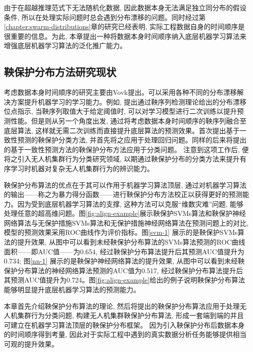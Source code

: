 由于在超越推理范式下无法随机化数据, 因此数据本身无法满足独立同分布的假设条件, 所以在处理实际问题时总会遇到分布漂移的问题。同时经过第\ref{chapter:swarm-distributions}章的研究已经表明, 实际工程数据自身的时间顺序是很重要的信息。为此, 本章提出一种将数据本身时间顺序纳入底层机器学习算法来增强底层机器学习算法的泛化推广能力。

\subsection{鞅保护分布方法研究现状}
考虑数据本身时间顺序的研究主要由Vovk提出。可以采用各种不同的分布漂移解决方案提升机器学习的学习能力。例如, \citet{Vovk2021retrain}提出通过鞅序列检测理论给出的分布漂移位点指示, 当鞅序列取值大于给定阈值时, 可以对学习模型进行二次训练以提升预测性能。但是则从另一个角度出发, 通过将考虑数据本身时间顺序的鞅序列融合至底层算法, 这样就无需二次训练而直接提升底层算法的预测效果。\citet{Vovk2021protectedregression}首次提出基于一致性预测的鞅保护分类方法, 并首先将之应用于处理回归问题。同样的\citet{Vovk2021protectedclassification}后来将提出的基于一致性预测方法的鞅保护分布方法应用于分类问题。 注意到这项工作后, 便将之引入无人机集群行为分类研究领域, 以期通过鞅保护分布的分类方法来提升有序学习时机器对复杂无人机集群行为的辨识能力。 

鞅保护分布算法的优点在于其可以作用于机器学习算法顶层, 通过对机器学习算法的输出——称之为暴力得分函数——进行鞅保护分布方法校正以获得更好的预测能力。因为受到底层机器学习算法的支撑, 这种方法可以克服“维数灾难”问题, 能够处理任意的超高维问题。图\ref{fig:align-example}展示鞅保护SVMs算法和鞅保护神经网络算法与无保护措施SVMs算法和无保护措施神经网络算法在预测问题上的对比, 模型的预测效果采用ROC曲线作为评价指标。图\ref{svm-1} 展示的是鞅保护SVMs算法的提升效果, 从图中可以看到未经鞅保护分布算法的SVMs算法预测的ROC曲线面积——即AUC值——为0.654, 经过鞅保护分布算法提升后其预测AUC值提升为0.734; 图\ref{nn-1} 展示的是鞅保护神经网络算法的提升效果, 从图中可以看到未经鞅保护分布算法的神经网络算法预测的AUC值为0.517, 经过鞅保护分布算法提升后其预测AUC值提升为0.724。图\ref{fig:align-example}给出的例子说明鞅保护分布算法能够明显提升底层机器学习算法的预测能力。

本章首先介绍鞅保护分布算法的理论, 然后将提出的鞅保护分布算法应用于处理无人机集群行为分类问题, 构建无人机集群鞅保护分布算法, 形成一套端到端的并且可建立在机器学习算法顶层的鞅保护分布框架。 因为引入鞅保护分布后数据本身的时间顺序得到考量, 因此对于实际工程中遇到的真实数据分析任务能够提供相当可观的提升效果。

%

